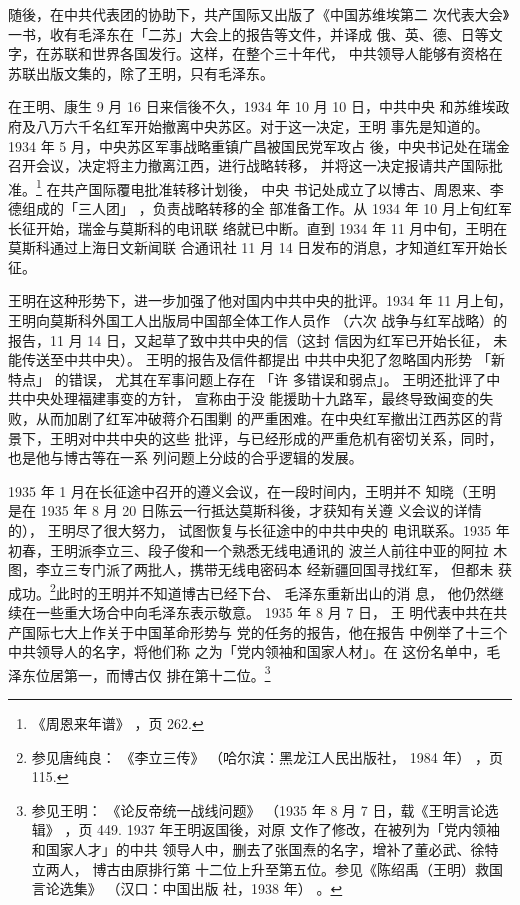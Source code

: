 随後，在中共代表团的协助下，共产国际又出版了《中国苏维埃第二
次代表大会》一书，收有毛泽东在「二苏」大会上的报告等文件，并译成
俄、英、德、日等文字，在苏联和世界各国发行。这样，在整个三十年代，
中共领导人能够有资格在苏联出版文集的，除了王明，只有毛泽东。

在王明、康生 9 月 16 日来信後不久，1934 年 10 月 10 日，中共中央
和苏维埃政府及八万六千名红军开始撤离中央苏区。对于这一决定，王明
事先是知道的。1934 年 5 月，中央苏区军事战略重镇广昌被国民党军攻占
後，中央书记处在瑞金召开会议，决定将主力撤离江西，进行战略转移，
并将这一决定报请共产国际批准。\footnote{《周恩来年谱》
，页 262.} 在共产国际覆电批准转移计划後，
中央
书记处成立了以博古、周恩来、李德组成的「三人团」
，负责战略转移的全
部准备工作。从 1934 年 10 月上旬红军长征开始，瑞金与莫斯科的电讯联
络就已中断。直到 1934 年 11 月中旬，王明在莫斯科通过上海日文新闻联
合通讯社 11 月 14 日发布的消息，才知道红军开始长征。

王明在这种形势下，进一步加强了他对国内中共中央的批评。1934
年 11 月上旬，
王明向莫斯科外国工人出版局中国部全体工作人员作
（六次 战争与红军战略）的报告，11 月 14 日，又起草了致中共中央的信（这封
信因为红军已开始长征， 未能传送至中共中央）。 王明的报告及信件都提出
中共中央犯了忽略国内形势
「新特点」 的错误，
尤其在军事问题上存在
「许 多错误和弱点」。 王明还批评了中共中央处理福建事变的方针，
宣称由于没
能援助十九路军，最终导致闽变的失败，从而加剧了红军冲破蒋介石围剿
的严重困难。在中央红军撤出江西苏区的背景下，王明对中共中央的这些
批评，与已经形成的严重危机有密切关系，同时，也是他与博古等在一系
列问题上分歧的合乎逻辑的发展。

1935 年 1 月在长征途中召开的遵义会议，在一段时间内，王明并不 知晓（王明
是在 1935 年 8 月 20 日陈云一行抵达莫斯科後，才获知有关遵 义会议的详情
的）， 王明尽了很大努力， 试图恢复与长征途中的中共中央的 电讯联系。1935
年初春，王明派李立三、段子俊和一个熟悉无线电通讯的 波兰人前往中亚的阿拉
木图，李立三专门派了两批人，携带无线电密码本 经新疆回国寻找红军， 但都未
获成功。\footnote{参见唐纯良： 《李立三传》 （哈尔滨：黑龙江人民出版社，
1984 年） ，页 115.}此时的王明并不知道博古已经下台、 毛泽东重新出山的消
息， 他仍然继续在一些重大场合中向毛泽东表示敬意。 1935 年 8 月 7 日， 王
明代表中共在共产国际七大上作关于中国革命形势与 党的任务的报告，他在报告
中例举了十三个中共领导人的名字，将他们称 之为「党内领袖和国家人材」。在
这份名单中，毛泽东位居第一，而博古仅 排在第十二位。\footnote{参见王明：
《论反帝统一战线问题》 （1935 年 8 月 7 日，载《王明言论选辑》 ，页 449.
1937 年王明返国後，对原 文作了修改，在被列为「党内领袖和国家人才」的中共
领导人中，删去了张国焘的名字，增补了董必武、徐特立两人， 博古由原排行第
十二位上升至第五位。参见《陈绍禹（王明）救国言论选集》 （汉口：中国出版
社，1938 年） 。} 

